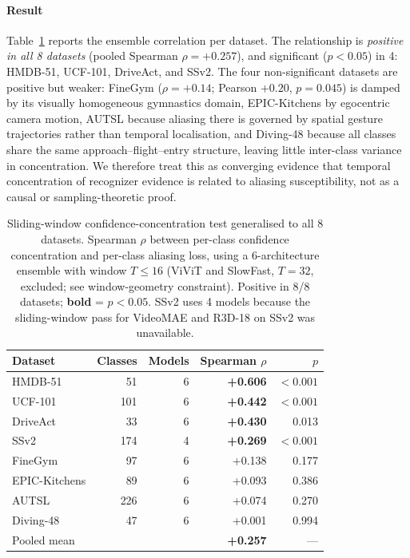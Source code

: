 \documentclass[a4paper, 10pt, conference, onecolumn]{ieeeconf}
\newcommand{\tabtight}{\setlength{\tabcolsep}{3.5pt}\renewcommand{\arraystretch}{1.12}}
\begin{document}
\paragraph{Result} Table~\ref{tab:sw_ensemble} reports the ensemble correlation per dataset. The relationship is \emph{positive in all 8 datasets} (pooled Spearman $\rho=+0.257$), and significant ($p<0.05$) in 4: HMDB-51, UCF-101, DriveAct, and SSv2. The four non-significant datasets are positive but weaker: FineGym ($\rho=+0.14$; Pearson $+0.20$, $p=0.045$) is damped by its visually homogeneous gymnastics domain, EPIC-Kitchens by egocentric camera motion, AUTSL because aliasing there is governed by spatial gesture trajectories rather than temporal localisation, and Diving-48 because all classes share the same approach--flight--entry structure, leaving little inter-class variance in concentration. We therefore treat this as converging evidence that temporal concentration of recognizer evidence is related to aliasing susceptibility, not as a causal or sampling-theoretic proof.

\begin{table}[!htbp]
\centering
\caption{Sliding-window confidence-concentration test generalised to all 8 datasets. Spearman $\rho$ between per-class confidence concentration and per-class aliasing loss, using a 6-architecture ensemble with window $T\le16$ (ViViT and SlowFast, $T=32$, excluded; see window-geometry constraint). Positive in 8/8 datasets; \textbf{bold} = $p<0.05$. SSv2 uses 4 models because the sliding-window pass for VideoMAE and R3D-18 on SSv2 was unavailable.}
\label{tab:sw_ensemble}
\scriptsize\tabtight
\begin{tabular}{l r r r r}
\toprule
Dataset & Classes & Models & Spearman $\rho$ & $p$ \\
\midrule
HMDB-51       &  51 & 6 & \textbf{+0.606} & ${<}0.001$ \\
UCF-101       & 101 & 6 & \textbf{+0.442} & ${<}0.001$ \\
DriveAct      &  33 & 6 & \textbf{+0.430} & 0.013 \\
SSv2          & 174 & 4 & \textbf{+0.269} & ${<}0.001$ \\
FineGym       &  97 & 6 & +0.138 & 0.177 \\
EPIC-Kitchens &  89 & 6 & +0.093 & 0.386 \\
AUTSL         & 226 & 6 & +0.074 & 0.270 \\
Diving-48     &  47 & 6 & +0.001 & 0.994 \\
\midrule
Pooled mean   &     &   & \textbf{+0.257} & --- \\
\bottomrule
\end{tabular}
\end{table}
\end{document}
